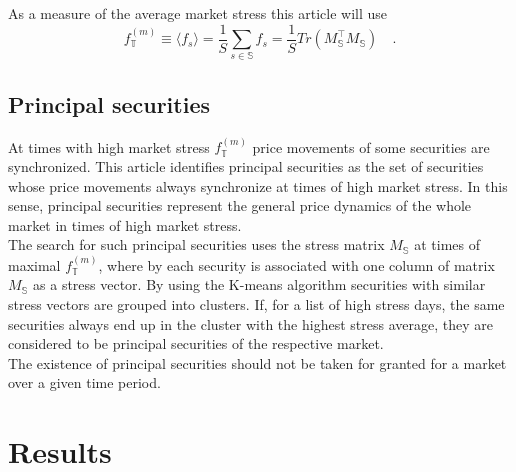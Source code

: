 \documentclass[11pt,twoside,a4paper]{article}
\numberwithin{equation}{section}
\numberwithin{figure}{section}
\numberwithin{table}{section}
\begin{document}
As a measure of the average market stress this article will use
\begin{equation}
f^{(m)}_\mathbb{T} \equiv \langle f_s\rangle=\frac{1}{S}\sum_{s\in\mathbb{S}}f_s=\frac{1}{S}Tr\left(M_\mathbb{S}^\top M_\mathbb{S}\right)\quad.
\end{equation}
\FloatBarrier
\subsection{Principal securities}
At times with high market stress $f^{(m)}_\mathbb{T}$ price movements of some securities are synchronized. This article identifies principal securities as the set of securities whose price movements always synchronize at times of high market stress. In this sense, principal securities represent the general price dynamics of the whole market in times of high market stress.\\
The search for such principal securities uses the stress matrix $M_\mathbb{S}$ at times of maximal $f^{(m)}_\mathbb{T}$, where by each security is associated with one column of matrix $M_\mathbb{S}$ as a stress vector. By using the K-means algorithm securities with similar stress vectors are grouped into clusters. If, for a list of high stress days, the same securities always end up in the cluster with the highest stress average, they are considered to be principal securities of the respective market.\\
The existence of principal securities should not be taken for granted for a market over a given time period.
\FloatBarrier
\pagebreak
\section{Results}
\end{document}
